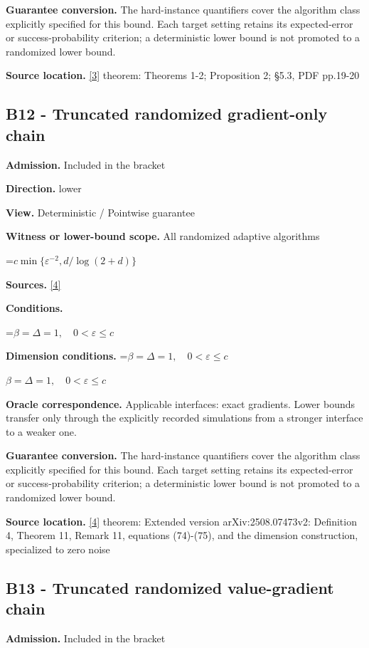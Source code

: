 \documentclass[10pt,a4paper]{article}
\newcommand{\AtlasMath}[1]{\par\begingroup\centering\setbox0=\hbox{$\displaystyle #1$}\ifdim\wd0>1.4\linewidth\typeout{ATLAS WIDE FORMULA: \the\wd0}\fi\ifdim\wd0>\linewidth\resizebox{\linewidth}{!}{\box0}\else\box0\fi\par\endgroup}
\newcommand{\AtlasInlineMath}[1]{\begingroup\setbox0=\hbox{$#1$}\ifdim\wd0>.4\linewidth\endgroup\AtlasMath{#1}\else\endgroup$#1$\fi}
\begin{document}
\textbf{Guarantee conversion.} The hard-instance quantifiers cover the algorithm class explicitly specified for this bound. Each target setting retains its expected-error or success-probability criterion; a deterministic lower bound is not promoted to a randomized lower bound.

\textbf{Source location.} \href{https://arxiv.org/pdf/1710.11606}{[3]} theorem: Theorems 1-2; Proposition 2; §5.3, PDF pp.19-20

\subsection{B12 - Truncated randomized gradient-only chain}
\textbf{Admission.} Included in the bracket

\textbf{Direction.} lower

\textbf{View.} Deterministic / Pointwise guarantee

\textbf{Witness or lower-bound scope.} All randomized adaptive algorithms

\AtlasMath{c\min\{\varepsilon^{-2},d/\log(2+d)\}}
\textbf{Sources.} \href{https://proceedings.mlr.press/v313/liu26a.html}{[4]}

\textbf{Conditions.} 


\AtlasMath{\beta=\Delta=1,\quad0<\varepsilon\le c}




\textbf{Dimension conditions.} \AtlasInlineMath{\beta=\Delta=1,\quad0<\varepsilon\le c}

\textbf{Oracle correspondence.} Applicable interfaces: exact gradients. Lower bounds transfer only through the explicitly recorded simulations from a stronger interface to a weaker one.

\textbf{Guarantee conversion.} The hard-instance quantifiers cover the algorithm class explicitly specified for this bound. Each target setting retains its expected-error or success-probability criterion; a deterministic lower bound is not promoted to a randomized lower bound.

\textbf{Source location.} \href{https://proceedings.mlr.press/v313/liu26a.html}{[4]} theorem: Extended version arXiv:2508.07473v2: Definition 4, Theorem 11, Remark 11, equations (74)-(75), and the dimension construction, specialized to zero noise

\subsection{B13 - Truncated randomized value-gradient chain}
\textbf{Admission.} Included in the bracket
\end{document}
